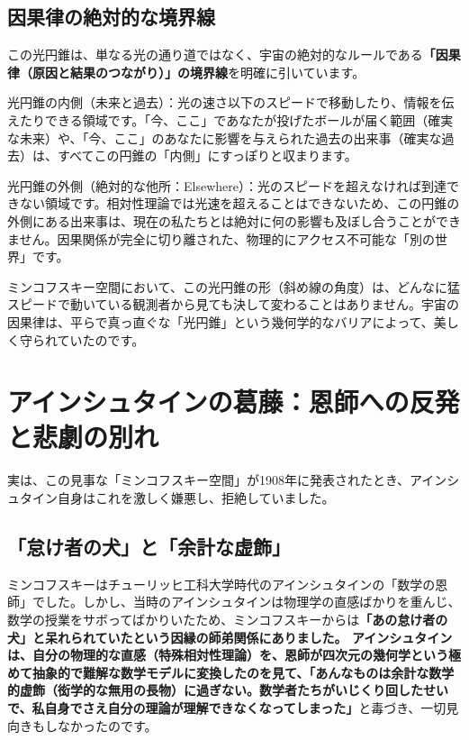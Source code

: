 \subsection{因果律の絶対的な境界線}

この光円錐は、単なる光の通り道ではなく、宇宙の絶対的なルールである\textbf{「因果律（原因と結果のつながり）」の境界線}を明確に引いています。

光円錐の内側（未来と過去）：光の速さ以下のスピードで移動したり、情報を伝えたりできる領域です。「今、ここ」であなたが投げたボールが届く範囲（確実な未来）や、「今、ここ」のあなたに影響を与えられた過去の出来事（確実な過去）は、すべてこの円錐の「内側」にすっぽりと収まります。

光円錐の外側（絶対的な他所：Elsewhere）：光のスピードを超えなければ到達できない領域です。相対性理論では光速を超えることはできないため、この円錐の外側にある出来事は、現在の私たちとは絶対に何の影響も及ぼし合うことができません。因果関係が完全に切り離された、物理的にアクセス不可能な「別の世界」です。

ミンコフスキー空間において、この光円錐の形（斜め線の角度）は、どんなに猛スピードで動いている観測者から見ても決して変わることはありません。宇宙の因果律は、平らで真っ直ぐな「光円錐」という幾何学的なバリアによって、美しく守られていたのです。

\section{アインシュタインの葛藤：恩師への反発と悲劇の別れ}

実は、この見事な「ミンコフスキー空間」が1908年に発表されたとき、アインシュタイン自身はこれを激しく嫌悪し、拒絶していました。

\subsection{「怠け者の犬」と「余計な虚飾」}

ミンコフスキーはチューリッヒ工科大学時代のアインシュタインの「数学の恩師」でした。しかし、当時のアインシュタインは物理学の直感ばかりを重んじ、数学の授業をサボってばかりいたため、ミンコフスキーからは\textbf{「あの怠け者の犬」と呆れられていたという因縁の師弟関係にありました。 アインシュタインは、自分の物理的な直感（特殊相対性理論）を、恩師が四次元の幾何学という極めて抽象的で難解な数学モデルに変換したのを見て、「あんなものは余計な数学的虚飾（衒学的な無用の長物）に過ぎない。数学者たちがいじくり回したせいで、私自身でさえ自分の理論が理解できなくなってしまった」}と毒づき、一切見向きもしなかったのです。

